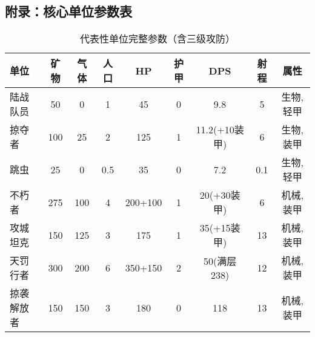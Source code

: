 \documentclass[a4paper,12pt]{article}
\begin{document}
\begin{CJK}{UTF8}{gbsn}
\appendix
\section{附录：核心单位参数表}

\begin{table}[h]
\centering
\caption{代表性单位完整参数（含三级攻防）}
\scriptsize
\begin{tabular}{lcccccccc}
\toprule
\textbf{单位} & \textbf{矿物} & \textbf{气体} & \textbf{人口} & \textbf{HP} & \textbf{护甲} & \textbf{DPS} & \textbf{射程} & \textbf{属性} \\
\midrule
陆战队员 & 50 & 0 & 1 & 45 & 0 & 9.8 & 5 & 生物,轻甲 \\
掠夺者 & 100 & 25 & 2 & 125 & 1 & 11.2(+10装甲) & 6 & 生物,装甲 \\
跳虫 & 25 & 0 & 0.5 & 35 & 0 & 7.2 & 0.1 & 生物,轻甲 \\
不朽者 & 275 & 100 & 4 & 200+100 & 1 & 20(+30装甲) & 6 & 机械,装甲 \\
攻城坦克 & 150 & 125 & 3 & 175 & 1 & 35(+15装甲) & 13 & 机械,装甲 \\
天罚行者 & 300 & 200 & 6 & 350+150 & 2 & 50(满层238) & 12 & 机械,装甲 \\
掠袭解放者 & 150 & 150 & 3 & 180 & 0 & 118 & 13 & 机械,装甲 \\
\bottomrule
\end{tabular}
\end{table}

\end{CJK}
\end{document}

